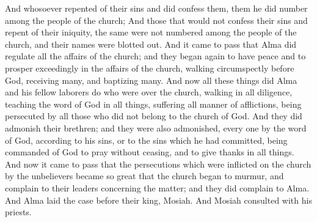 \bverse \iffalse And whosoever repented of their sins and did confess them, them he did number among the people of the church; \fi
And whosoever repented of their sins and did confess them, them he did number among the people of the church;
\bverse \iffalse And those that would not confess their sins and repent of their iniquity, the same were not numbered among the people of the church, and their names were blotted out. \fi
And those that would not confess their sins and repent of their iniquity, the same were not numbered among the people of the church, and their names were blotted out.
\bverse \iffalse And it came to pass that Alma did regulate all the affairs of the church; and they began again to have peace and to prosper exceedingly in the affairs of the church, walking circumspectly before God, receiving many, and baptizing many. \fi
And it came to pass that Alma did regulate all the affairs of the church; and they began again to have peace and to prosper exceedingly in the affairs of the church, walking circumspectly before God, receiving many, and baptizing many.
\bverse \iffalse And now all these things did Alma and his fellow laborers do who were over the church, walking in all diligence, teaching the word of God in all things, suffering all manner of afflictions, being persecuted by all those who did not belong to the church of God. \fi
And now all these things did Alma and his fellow laborers do who were over the church, walking in all diligence, teaching the word of God in all things, suffering all manner of afflictions, being persecuted by all those who did not belong to the church of God.
\bverse \iffalse And they did admonish their brethren; and they were also admonished, every one by the word of God, according to his sins, or to the sins which he had committed, being commanded of God to pray without ceasing, and to give thanks in all things. \fi
And they did admonish their brethren; and they were also admonished, every one by the word of God, according to his sins, or to the sins which he had committed, being commanded of God to pray without ceasing, and to give thanks in all things.
\bchapter
\bverse \iffalse And now it came to pass that the persecutions which were inflicted on the church by the unbelievers became so great that the church began to murmur, and complain to their leaders concerning the matter; and they did complain to Alma. And Alma laid the case before their king, Mosiah. And Mosiah consulted with his priests. \fi
And now it came to pass that the persecutions which were inflicted on the church by the unbelievers became so great that the church began to murmur, and complain to their leaders concerning the matter; and they did complain to Alma. And Alma laid the case before their king, Mosiah. And Mosiah consulted with his priests.
